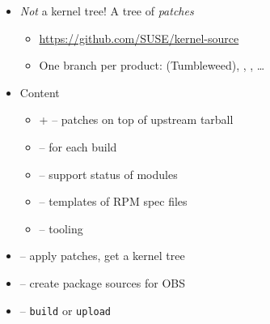 \begin{frame}{}

  \begin{itemize}[<+->]
    \item \emph{Not} a kernel tree! A tree of \emph{patches}
      \begin{itemize}
	\item \url{https://github.com/SUSE/kernel-source}
	\item One branch per product:  (Tumbleweed), ,
	  , \dots
      \end{itemize}
    \item Content
      \begin{itemize}
	\item {} +  -- patches on top of upstream tarball
	\item {} --  for each build
	\item {} -- support status of modules
	\item {} -- templates of RPM spec files
	\item {} -- tooling
      \end{itemize}
    \item {} -- apply patches, get a kernel tree
    \item {} -- create package sources for OBS
    \item {} -- \texttt{build} or \texttt{upload}
  \end{itemize}

\end{frame}

